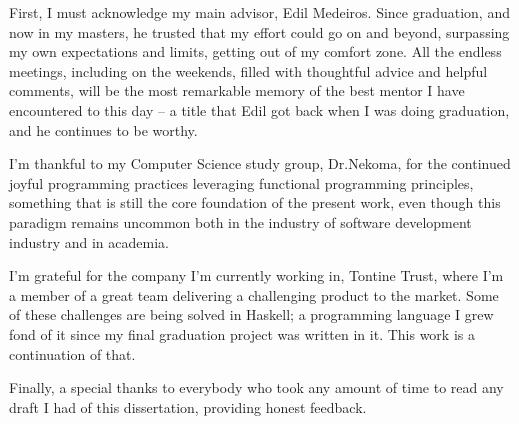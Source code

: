 First, I must acknowledge my main advisor, Edil Medeiros.
Since graduation, and now in my masters, he trusted that my effort could go on and beyond, surpassing my own expectations
and limits, getting out of my comfort zone. All the endless meetings, including on the weekends, filled with thoughtful advice and helpful comments,
will be the most remarkable memory of the best mentor I have encountered to this day -- a title that Edil got back when I was doing graduation, and he
continues to be worthy.

I'm thankful to my Computer Science study group, Dr.Nekoma, for the continued joyful programming practices leveraging functional programming principles, something that is
still the core foundation of the present work, even though this paradigm remains uncommon both in the industry of software development industry and in academia.

I'm grateful for the company I'm currently working in, Tontine Trust, where I'm a member of a great team delivering a challenging product to the market. Some of these challenges are being solved in Haskell; a programming language
I grew fond of it since my final graduation project was written in it. This work is a continuation of that.

Finally, a special thanks to everybody who took any amount of time to read any draft I had of this dissertation, providing honest feedback. 
